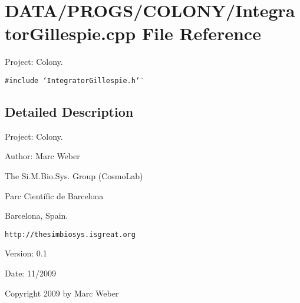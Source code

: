 \section{DATA/PROGS/COLONY/IntegratorGillespie.cpp File Reference}
\label{IntegratorGillespie_8cpp}
Project: Colony. 

{\tt \#include \char`\"{}IntegratorGillespie.h\char`\"{}}\par


\subsection{Detailed Description}
Project: Colony. 

\begin{Desc}
\item[Author:]Marc Weber\par
 The Si.M.Bio.Sys. Group (CosmoLab)\par
 Parc Científic de Barcelona\par
 Barcelona, Spain.\par
 {\tt http://thesimbiosys.isgreat.org} \end{Desc}
\begin{Desc}
\item[Version:]0.1 \end{Desc}
\begin{Desc}
\item[Date:]11/2009\end{Desc}
Copyright 2009 by Marc Weber 